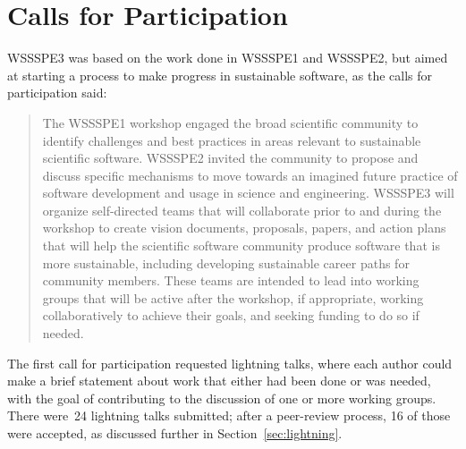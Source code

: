 \documentclass[11pt, oneside]{amsart}
\begin{document}
\section{Calls for Participation} \label{sec:preworkshop}

WSSSPE3 was based on the work done in WSSSPE1 and WSSSPE2, but aimed at starting
a process to make progress in sustainable software, as the calls for
participation said:

\begin{quote} The WSSSPE1 workshop engaged the broad scientific community to
identify challenges and best practices in areas relevant to sustainable
scientific software. WSSSPE2 invited the community to propose and discuss
specific mechanisms to move towards an imagined future practice of software
development and usage in science and engineering. WSSSPE3 will organize
self-directed teams that will collaborate prior to and during the workshop to
create vision documents, proposals, papers, and action plans that will help the
scientific software community produce software that is more sustainable,
including developing sustainable career paths for community members. These teams
are intended to lead into working groups that will be active after the workshop,
if appropriate, working collaboratively to achieve their goals, and seeking
funding to do so if needed. \end{quote}

The first call for participation requested lightning talks, where each author
could make a brief statement about work that either had been done or was needed,
with the goal of contributing to the discussion of one or more working groups.
There were~24 lightning talks submitted; after a peer-review process, 16 of
those were accepted, as discussed further in Section~\ref{sec:lightning}.
\end{document}
